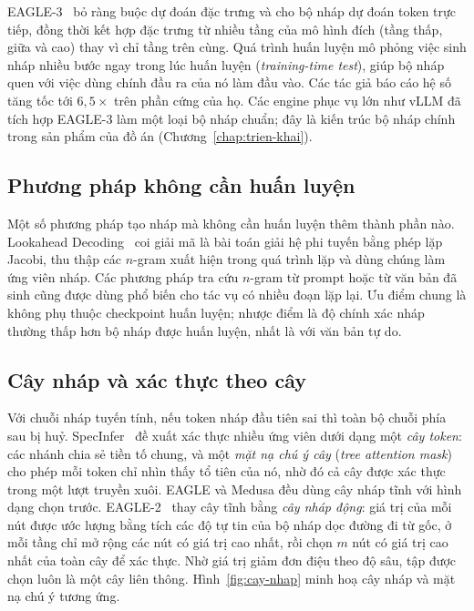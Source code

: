 EAGLE-3~\cite{li2025eagle3} bỏ ràng buộc dự đoán đặc trưng và cho bộ nháp dự đoán token trực tiếp, đồng thời kết hợp đặc trưng từ nhiều tầng của mô hình đích (tầng thấp, giữa và cao) thay vì chỉ tầng trên cùng. Quá trình huấn luyện mô phỏng việc sinh nháp nhiều bước ngay trong lúc huấn luyện (\textit{training-time test}), giúp bộ nháp quen với việc dùng chính đầu ra của nó làm đầu vào. Các tác giả báo cáo hệ số tăng tốc tới $6{,}5\times$ trên phần cứng của họ. Các engine phục vụ lớn như vLLM đã tích hợp EAGLE-3 làm một loại bộ nháp chuẩn; đây là kiến trúc bộ nháp chính trong sản phẩm của đồ án (Chương~\ref{chap:trien-khai}).

\subsection{Phương pháp không cần huấn luyện}

Một số phương pháp tạo nháp mà không cần huấn luyện thêm thành phần nào. Lookahead Decoding~\cite{fu2024lookahead} coi giải mã là bài toán giải hệ phi tuyến bằng phép lặp Jacobi, thu thập các $n$-gram xuất hiện trong quá trình lặp và dùng chúng làm ứng viên nháp. Các phương pháp tra cứu $n$-gram từ prompt hoặc từ văn bản đã sinh cũng được dùng phổ biến cho tác vụ có nhiều đoạn lặp lại. Ưu điểm chung là không phụ thuộc checkpoint huấn luyện; nhược điểm là độ chính xác nháp thường thấp hơn bộ nháp được huấn luyện, nhất là với văn bản tự do.

\subsection{Cây nháp và xác thực theo cây}

Với chuỗi nháp tuyến tính, nếu token nháp đầu tiên sai thì toàn bộ chuỗi phía sau bị huỷ. SpecInfer~\cite{miao2024specinfer} đề xuất xác thực nhiều ứng viên dưới dạng một \textit{cây token}: các nhánh chia sẻ tiền tố chung, và một \textit{mặt nạ chú ý cây} (\textit{tree attention mask}) cho phép mỗi token chỉ nhìn thấy tổ tiên của nó, nhờ đó cả cây được xác thực trong một lượt truyền xuôi. EAGLE và Medusa đều dùng cây nháp tĩnh với hình dạng chọn trước. EAGLE-2~\cite{li2024eagle2} thay cây tĩnh bằng \textit{cây nháp động}: giá trị của mỗi nút được ước lượng bằng tích các độ tự tin của bộ nháp dọc đường đi từ gốc, ở mỗi tầng chỉ mở rộng các nút có giá trị cao nhất, rồi chọn $m$ nút có giá trị cao nhất của toàn cây để xác thực. Nhờ giá trị giảm đơn điệu theo độ sâu, tập được chọn luôn là một cây liên thông. Hình~\ref{fig:cay-nhap} minh hoạ cây nháp và mặt nạ chú ý tương ứng.

